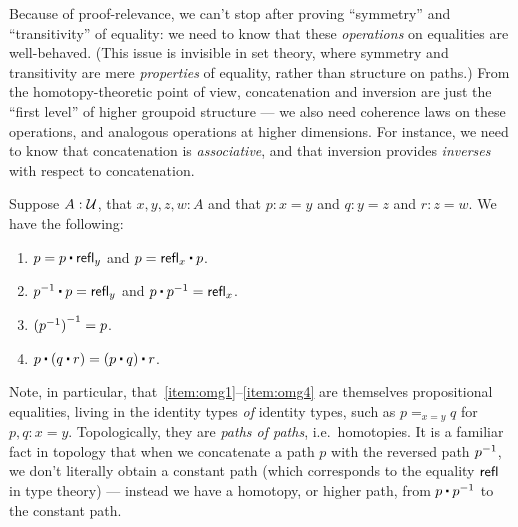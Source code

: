 Because of proof-relevance, we can't stop after proving ``symmetry'' and ``transitivity'' of equality: we need to know that these \emph{operations} on equalities are well-behaved.
(This issue is invisible in set theory, where symmetry and transitivity are mere \emph{properties} of equality, rather than structure on
paths.)
From the homotopy-theoretic point of view, concatenation and inversion are just the ``first level'' of higher groupoid structure --- we also need coherence laws on these operations, and analogous operations at higher dimensions.
For instance, we need to know that concatenation is \emph{associative}, and that inversion provides \emph{inverses} with respect to concatenation.

\begin{lem}\label{thm:omg}%
  Suppose $A:\mathcal{U}$, that $x,y,z,w:A$ and that $p:x= y$ and $q:y = z$ and $r:z=w$.
  We have the following:
  \begin{enumerate}
  \item $p= p\ct \refl{y}$ and $p = \refl{x} \ct p$.\label{item:omg1}
  \item $\opp{p}\ct p=  \refl{y}$ and $p\ct \opp{p}= \refl{x}$.
  \item $\mathord{{(\mathord{{p}^{-1}})}^{-1}}= p$.
  \item $p\ct (q\ct r)=  (p\ct q)\ct r$.\label{item:omg4}
  \end{enumerate}
\end{lem}

Note, in particular, that~\ref{item:omg1}--\ref{item:omg4} are themselves propositional equalities, living in the identity types \emph{of} identity types, such as $p=_{x=y}q$ for $p,q:x=y$.
Topologically, they are \emph{paths of paths}, i.e.\ homotopies.
It is a familiar fact in topology that when we concatenate a path $p$ with the reversed path $\mathord{{p}^{-1}}$, we don't literally obtain a constant path (which corresponds to the equality $\mathsf{refl}_{}$ in type theory) --- instead we have a homotopy, or higher path, from $p\ct\opp p$ to the constant path.

